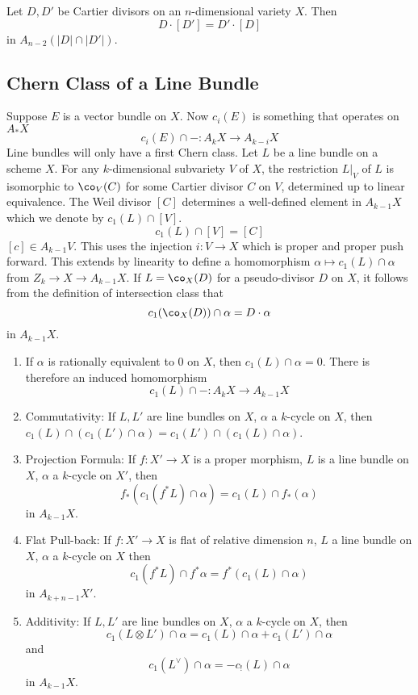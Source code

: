 \begin{thmm}
Let $D,D'$ be Cartier divisors on an $n$-dimensional variety $X$. Then
	\[
	D \cdot [D'] = D' \cdot [D]
	\]
in $A_{n-2}(|D| \cap |D'|)$.
\end{thmm}


\subsection{Chern Class of a Line Bundle}


Suppose $E$ is a vector bundle on $X$. Now $c_i(E)$ is something that operates on $A_*X$
	\[
	c_i(E) \cap - : A_k X \to A_{k-i} X
	\]
Line bundles will only have a first Chern class. Let $L$ be a line bundle on a scheme $X$. For any $k$-dimensional subvariety $V$ of $X$, the restriction $L\big|_V$ of $L$ is isomorphic to $\co_V(C)$ for some Cartier divisor $C$ on $V$, determined up to linear equivalence. The Weil divisor $[C]$ determines a well-defined element in $A_{k-1}X$ which we denote by $c_1(L) \cap [V]$.
	\[
	c_1(L) \cap [V]= [C]
	\]
$[c] \in A_{k-1}V$. This uses the injection $i: V \to X$ which is proper and proper push forward. This extends by linearity to define a homomorphism $\alpha \mapsto c_1(L) \cap \alpha$ from $Z_k \to X \to A_{k-1}X$. If $L=\co_X(D)$ for a pseudo-divisor $D$ on $X$, it follows from the definition of intersection class that
	\[
	c_1(\co_X(D)) \cap \alpha = D \cdot \alpha
	\]
in $A_{k-1}X$. 


\begin{prop} \hfill
\begin{enumerate}
\item If $\alpha$ is rationally equivalent to 0 on $X$, then $c_1(L) \cap \alpha=0$. There is therefore an induced homomorphism
	\[
	c_1(L) \cap - : A_k X \to A_{k-1}X
	\]
\item Commutativity: If $L,L'$ are line bundles on $X$, $\alpha$ a $k$-cycle on $X$, then $c_1(L) \cap (c_1(L') \cap \alpha)= c_1(L') \cap (c_1(L) \cap \alpha)$. 
\item Projection Formula: If $f: X' \to X$ is a proper morphism, $L$ is a line bundle on $X$, $\alpha$ a $k$-cycle on $X'$, then
	\[
	f_*(c_1(f^*L) \cap \alpha)= c_1(L) \cap f_*(\alpha)
	\]
in $A_{k-1}X$.
\item Flat Pull-back: If $f: X' \to X$ is flat of relative dimension $n$, $L$ a line bundle on $X$, $\alpha$ a $k$-cycle on $X$ then
	\[
	c_1(f^*L) \cap f^*\alpha= f^*(c_1(L) \cap \alpha)
	\]
in $A_{k+n-1}X'$.
\item Additivity: If $L,L'$ are line bundles on $X$, $\alpha$ a $k$-cycle on $X$, then
	\[
	c_1(L \otimes L') \cap \alpha= c_1(L) \cap \alpha + c_1(L') \cap \alpha
	\]
and
	\[
	c_1(L^\vee) \cap \alpha = -c_!(L) \cap \alpha
	\]
in $A_{k-1}X$.
\end{enumerate}
\end{prop}


